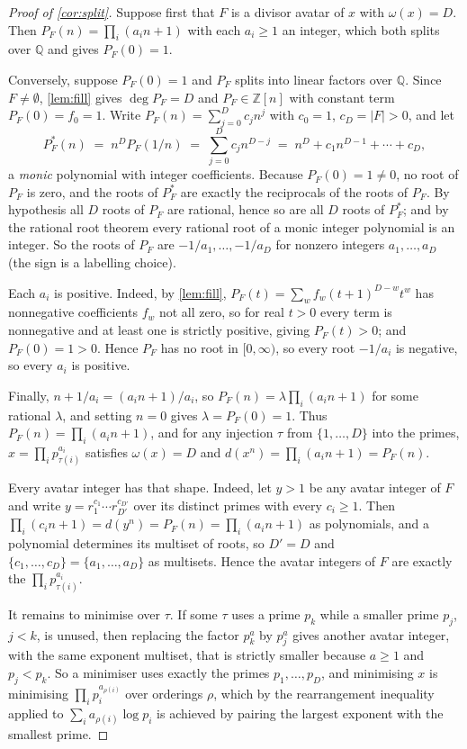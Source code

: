 \documentclass[11pt]{amsart}
\theoremstyle{definition}
\theoremstyle{remark}
\begin{document}
\begin{proof}[Proof of \cref{cor:split}]
Suppose first that $F$ is a divisor avatar of $x$ with $\omega(x)=D$. Then $P_{F}(n)=\prod_{i}(a_{i}n+1)$ with each $a_{i} \ge 1$ an integer, which both splits over $\mathbb{Q}$ and gives $P_{F}(0)=1$.

Conversely, suppose $P_{F}(0)=1$ and $P_{F}$ splits into linear factors over $\mathbb{Q}$. Since $F \neq \emptyset$, \cref{lem:fill} gives $\deg P_{F}=D$ and $P_{F} \in \mathbb{Z}[n]$ with constant term $P_{F}(0)=f_{0}=1$. Write $P_{F}(n)=\sum_{j=0}^{D}c_{j}n^{j}$ with $c_{0}=1$, $c_{D}=|F| > 0$, and let
\[
  P^{*}_{F}(n) \;=\; n^{D}P_{F}(1/n) \;=\; \sum_{j=0}^{D}c_{j}n^{D-j} \;=\; n^{D} + c_{1}n^{D-1} + \cdots + c_{D},
\]
a \emph{monic} polynomial with integer coefficients. Because $P_{F}(0)=1 \neq 0$, no root of $P_{F}$ is zero, and the roots of $P^{*}_{F}$ are exactly the reciprocals of the roots of $P_{F}$. By hypothesis all $D$ roots of $P_{F}$ are rational, hence so are all $D$ roots of $P^{*}_{F}$; and by the rational root theorem every rational root of a monic integer polynomial is an integer. So the roots of $P_{F}$ are $-1/a_{1},\dots,-1/a_{D}$ for nonzero integers $a_{1},\dots,a_{D}$ (the sign is a labelling choice).

Each $a_{i}$ is positive. Indeed, by \cref{lem:fill}, $P_{F}(t)=\sum_{w}f_{w}(t+1)^{D-w}t^{w}$ has nonnegative coefficients $f_{w}$ not all zero, so for real $t>0$ every term is nonnegative and at least one is strictly positive, giving $P_{F}(t)>0$; and $P_{F}(0)=1>0$. Hence $P_{F}$ has no root in $[0,\infty)$, so every root $-1/a_{i}$ is negative, so every $a_{i}$ is positive.

Finally, $n+1/a_{i} = (a_{i}n+1)/a_{i}$, so $P_{F}(n) = \lambda\prod_{i}(a_{i}n+1)$ for some rational $\lambda$, and setting $n=0$ gives $\lambda = P_{F}(0)=1$. Thus $P_{F}(n)=\prod_{i}(a_{i}n+1)$, and for any injection $\tau$ from $\{1,\dots,D\}$ into the primes, $x = \prod_{i}p_{\tau(i)}^{a_{i}}$ satisfies $\omega(x)=D$ and $d(x^{n})=\prod_{i}(a_{i}n+1)=P_{F}(n)$.

Every avatar integer has that shape. Indeed, let $y>1$ be any avatar integer of $F$ and write $y = r_{1}^{c_{1}}\cdots r_{D'}^{c_{D'}}$ over its distinct primes with every $c_{i} \ge 1$. Then $\prod_{i}(c_{i}n+1) = d(y^{n}) = P_{F}(n) = \prod_{i}(a_{i}n+1)$ as polynomials, and a polynomial determines its multiset of roots, so $D'=D$ and $\{c_{1},\dots,c_{D}\} = \{a_{1},\dots,a_{D}\}$ as multisets. Hence the avatar integers of $F$ are exactly the $\prod_{i}p_{\tau(i)}^{a_{i}}$.

It remains to minimise over $\tau$. If some $\tau$ uses a prime $p_{k}$ while a smaller prime $p_{j}$, $j<k$, is unused, then replacing the factor $p_{k}^{a}$ by $p_{j}^{a}$ gives another avatar integer, with the same exponent multiset, that is strictly smaller because $a \ge 1$ and $p_{j} < p_{k}$. So a minimiser uses exactly the primes $p_{1},\dots,p_{D}$, and minimising $x$ is minimising $\prod_{i}p_{i}^{a_{\rho(i)}}$ over orderings $\rho$, which by the rearrangement inequality applied to $\sum_{i}a_{\rho(i)}\log p_{i}$ is achieved by pairing the largest exponent with the smallest prime.
\end{proof}
\end{document}
